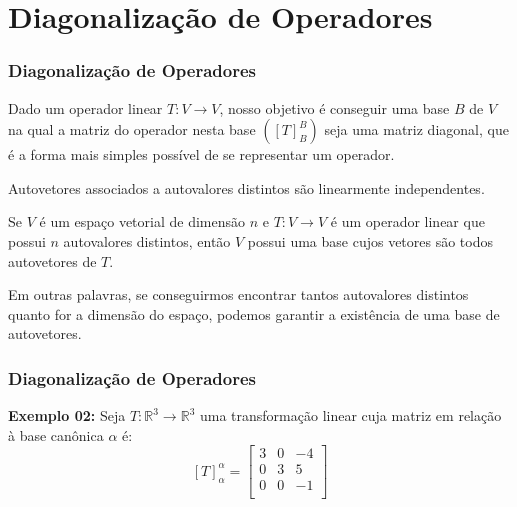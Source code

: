 \documentclass[hyperref={pdfpagelabels=false}]{beamer}
\begin{document}
\section{Diagonalização de Operadores}

\begin{frame}
\frametitle{Diagonalização de Operadores}

Dado um operador linear $T:V \rightarrow V$, nosso objetivo é conseguir uma base $B$ de $V$ na qual a matriz do operador nesta base $([T]_{B}^{B})$ seja uma matriz diagonal, que é a forma mais simples possível de se representar um operador.

\pause

\begin{theorem}
	Autovetores associados a autovalores distintos são linearmente independentes.
\end{theorem}

\begin{corollary}
	Se $V$ é um espaço vetorial de dimensão $n$ e $T:V \rightarrow V$ é um operador linear que possui $n$ autovalores distintos, então $V$ possui uma base cujos vetores são todos autovetores de $T$.
\end{corollary}

Em outras palavras, se conseguirmos encontrar tantos autovalores distintos quanto for a dimensão do espaço, podemos garantir a existência de uma base de autovetores.

\end{frame}


\begin{frame}
\frametitle{Diagonalização de Operadores}

{\bf Exemplo 02:} Seja $T: \mathbb{R}^3 \rightarrow \mathbb{R}^3$ uma transformação linear cuja matriz em relação à base canônica $\alpha$ é:
$$[T]^{\alpha}_{\alpha} = \left[
\begin{array}{ccc}
3	&	0	&	-4\\
0	&	3	&	5 \\
0	&	0	&	-1	\\
\end{array}
\right]$$

\end{frame}
\end{document}
